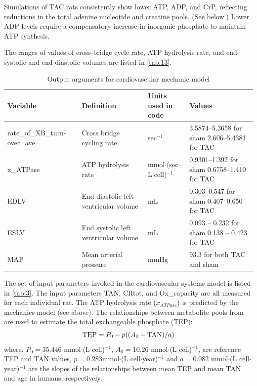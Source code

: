 \documentclass[fleqn,10pt]{physiome}
\begin{document}
Simulations of TAC rats consistently show lower ATP, ADP, and CrP, reflecting reductions in the total adenine nucleotide and creatine pools. (See below.) Lower ADP levels require a compensatory increase in inorganic phosphate to maintain ATP synthesis. 

The ranges of values of cross-bridge cycle rate, ATP hydrolysis rate, and end-systolic and end-diastolic volumes are listed in \autoref{tab:13}. 



\begin{table}[ht]\centering
\small
\caption{Output arguments for cardiovascular mechanic model}\label{tab:13}
\begin{supertabular}{p{2.5cm} p{3.0cm} p{2.5cm} p{3.4cm}}
\toprule
Variable & Definition & Units used in code & Values \\
\midrule

rate\_of\_XB\_turn-over\_ave 
& Cross bridge cycling rate & sec$^{-1}$ & 
3.5874--5.3658 for sham
2.606--5.4381 for TAC
 \\
 
x\_ATPase & ATP hydrolysis rate & mmol$\cdot$(sec$\cdot$L$\cdot$cell)$^{-1}$ & 
0.9301--1.392 for sham
0.6758--1.410 for TAC
\\

EDLV & End diastolic left ventricular volume
& mL & 
0.303--0.547 for sham
0.407--0.650 for TAC
 \\
 
ESLV & 
End systolic left ventricular volume
 & mL & 
  0.093 -- 0.232 for sham
0.138 -- 0.423 for TAC
 \\
 
MAP & Mean arterial pressure & mmHg & 93.3 for both TAC and sham \\

\bottomrule
\end{supertabular}
\end{table}

The set of input parameters invoked in the cardiovascular systems model is listed in \autoref{tab:3}. The input parameters TAN, CRtot, and Ox\_capacity are all measured for each individual rat. The ATP hydrolysis rate ($x_{ATPase}$) is predicted by the mechanics model (see above). The relationships between metabolite pools from \cite{Gao2019} are used to estimate the total exchangeable phosphate (TEP):
\[
  {\rm TEP} = P_{0} - p ((A_{0} - {\rm TAN} )/ a)
\]
where, $P_{0}= 35.446$ mmol$\cdot$(L cell)$^{-1}$,  $A_{0} = 10.26$ mmol$\cdot$(L cell)$^{-1}$, are reference TEP and TAN values, $p = 0.283$mmol$\cdot$(L cell$\cdot$year)$^{-1}$  and $a = 0.082$ mmol$\cdot$(L cell$\cdot$year)$^{-1}$ are the slopes of the relationships between mean TEP and mean TAN and age in humans, respectively. 
\end{document}
